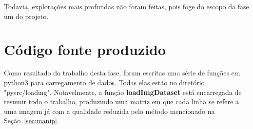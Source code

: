 \documentclass[12pt,oneside,a4paper]{article}
\begin{document}
Todavia, explorações mais profundas não foram feitas, pois foge do escopo da fase um do projeto.

\section{Código fonte produzido}

Como resultado do trabalho desta fase, foram escritas uma série de funções em python3 para carregamento de dados. Todas elas estão no diretório "pysrc/loading". Notavelmente, a função \textbf{loadImgDataset} está encarregada de resumir todo o trabalho, produzindo uma matriz em que cada linha se refere a uma imagem já com a qualidade reduzida pelo método mencionado na Seção~\ref{sec:manip}.

\clearpage
\end{document}
